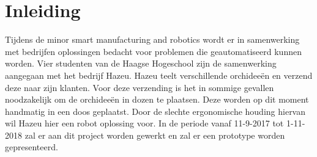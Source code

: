 \section{Inleiding}

Tijdens de minor smart manufacturing and robotics wordt er in samenwerking met bedrijfen oplossingen bedacht voor problemen die geautomatiseerd kunnen worden. Vier studenten van de Haagse Hogeschool zijn de samenwerking aangegaan met het bedrijf Hazeu. Hazeu teelt verschillende orchideeën en verzend deze naar zijn klanten. Voor deze verzending is het in sommige gevallen noodzakelijk om de orchideeën in dozen te plaatsen. Deze worden op dit moment handmatig in een doos geplaatst. Door de slechte ergonomische houding hiervan wil Hazeu hier een robot oplossing voor. In de periode vanaf 11-9-2017 tot 1-11-2018 zal er aan dit project worden gewerkt en zal er een prototype worden gepresenteerd.
 
\newpage